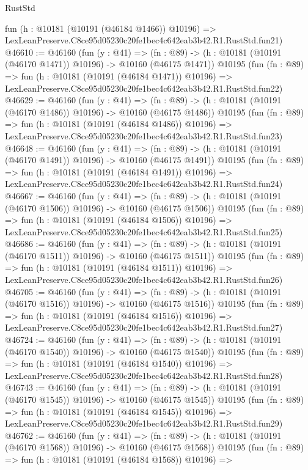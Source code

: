 \begin{lexlean}{RustStd}
\begin{coremodule}
    fun (h : @10181 (@10191 (@46184 @1466)) @10196) =>
    LexLeanPreserve.C8ce95d05230c20fe1bec4c642eab3b42.R1.RustStd.fun21)
@46610 := @46160
    (fun (y : @41) =>
    (fn : @89) -> (h : @10181 (@10191 (@46170 @1471)) @10196) -> @10160 (@46175 @1471))
    @10195
    (fun (fn : @89) =>
    fun (h : @10181 (@10191 (@46184 @1471)) @10196) =>
    LexLeanPreserve.C8ce95d05230c20fe1bec4c642eab3b42.R1.RustStd.fun22)
@46629 := @46160
    (fun (y : @41) =>
    (fn : @89) -> (h : @10181 (@10191 (@46170 @1486)) @10196) -> @10160 (@46175 @1486))
    @10195
    (fun (fn : @89) =>
    fun (h : @10181 (@10191 (@46184 @1486)) @10196) =>
    LexLeanPreserve.C8ce95d05230c20fe1bec4c642eab3b42.R1.RustStd.fun23)
@46648 := @46160
    (fun (y : @41) =>
    (fn : @89) -> (h : @10181 (@10191 (@46170 @1491)) @10196) -> @10160 (@46175 @1491))
    @10195
    (fun (fn : @89) =>
    fun (h : @10181 (@10191 (@46184 @1491)) @10196) =>
    LexLeanPreserve.C8ce95d05230c20fe1bec4c642eab3b42.R1.RustStd.fun24)
@46667 := @46160
    (fun (y : @41) =>
    (fn : @89) -> (h : @10181 (@10191 (@46170 @1506)) @10196) -> @10160 (@46175 @1506))
    @10195
    (fun (fn : @89) =>
    fun (h : @10181 (@10191 (@46184 @1506)) @10196) =>
    LexLeanPreserve.C8ce95d05230c20fe1bec4c642eab3b42.R1.RustStd.fun25)
@46686 := @46160
    (fun (y : @41) =>
    (fn : @89) -> (h : @10181 (@10191 (@46170 @1511)) @10196) -> @10160 (@46175 @1511))
    @10195
    (fun (fn : @89) =>
    fun (h : @10181 (@10191 (@46184 @1511)) @10196) =>
    LexLeanPreserve.C8ce95d05230c20fe1bec4c642eab3b42.R1.RustStd.fun26)
@46705 := @46160
    (fun (y : @41) =>
    (fn : @89) -> (h : @10181 (@10191 (@46170 @1516)) @10196) -> @10160 (@46175 @1516))
    @10195
    (fun (fn : @89) =>
    fun (h : @10181 (@10191 (@46184 @1516)) @10196) =>
    LexLeanPreserve.C8ce95d05230c20fe1bec4c642eab3b42.R1.RustStd.fun27)
@46724 := @46160
    (fun (y : @41) =>
    (fn : @89) -> (h : @10181 (@10191 (@46170 @1540)) @10196) -> @10160 (@46175 @1540))
    @10195
    (fun (fn : @89) =>
    fun (h : @10181 (@10191 (@46184 @1540)) @10196) =>
    LexLeanPreserve.C8ce95d05230c20fe1bec4c642eab3b42.R1.RustStd.fun28)
@46743 := @46160
    (fun (y : @41) =>
    (fn : @89) -> (h : @10181 (@10191 (@46170 @1545)) @10196) -> @10160 (@46175 @1545))
    @10195
    (fun (fn : @89) =>
    fun (h : @10181 (@10191 (@46184 @1545)) @10196) =>
    LexLeanPreserve.C8ce95d05230c20fe1bec4c642eab3b42.R1.RustStd.fun29)
@46762 := @46160
    (fun (y : @41) =>
    (fn : @89) -> (h : @10181 (@10191 (@46170 @1568)) @10196) -> @10160 (@46175 @1568))
    @10195
    (fun (fn : @89) =>
    fun (h : @10181 (@10191 (@46184 @1568)) @10196) =>

\end{coremodule}
\end{lexlean}
